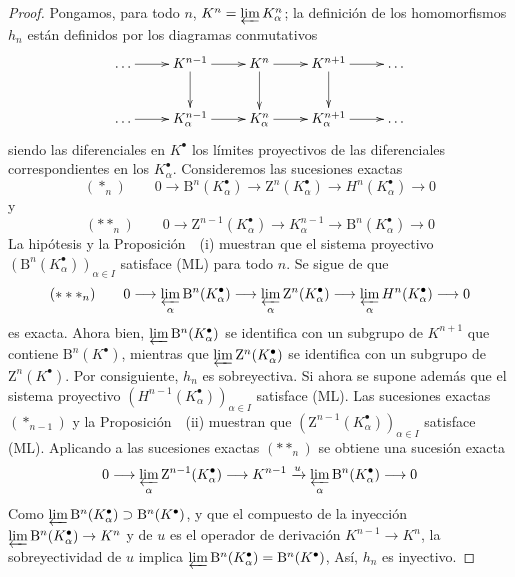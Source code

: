 \begin{proof}
Pongamos, para todo $n$, $K^n=\varprojlim K_\alpha^n$; la definición de los homomorfismos $h_n$ están definidos por los diagramas conmutativos
\[
\xymatrix{
\ldots\ar[r]&K^{n-1}\ar[r]\ar[d]&K^n\ar[r]\ar[d]
&K^{n+1}\ar[r]\ar[d]&\ldots\\
\ldots\ar[r]&K_\alpha^{n-1}\ar[r]&K_\alpha^n\ar[r]
&K_\alpha^{n+1}\ar[r]&\ldots
}
\]
siendo las diferenciales en $K^\bullet$ los límites proyectivos
de las diferenciales correspondientes en los
$K_\alpha^\bullet$.
Consideremos las sucesiones exactas
\[
(*_n)\qquad
0\longrightarrow \mathrm B^n(K_\alpha^\bullet)
\longrightarrow \mathrm Z^n(K_\alpha^\bullet)
\longrightarrow H^n(K_\alpha^\bullet)\longrightarrow0
\]
y
\[
(**_n)\qquad
0\longrightarrow \mathrm Z^{n-1}(K_\alpha^\bullet)
\longrightarrow K_\alpha^{n-1}
\longrightarrow \mathrm B^n(K_\alpha^\bullet)\longrightarrow0
\]
La hipótesis y la Proposición~~(i) muestran que el
sistema proyectivo
$(\mathrm B^n(K_\alpha^\bullet))_{\alpha\in I}$
satisface (ML) para todo $n$.
Se sigue de  que
\[
(***_n)\qquad
0\longrightarrow\varprojlim_\alpha\mathrm B^n(K_\alpha^\bullet)
\longrightarrow\varprojlim_\alpha\mathrm Z^n(K_\alpha^\bullet)
\longrightarrow\varprojlim_\alpha H^n(K_\alpha^\bullet)
\longrightarrow0
\]
es exacta.
Ahora bien,
$\varprojlim\mathrm B^n(K_\alpha^\bullet)$
se identifica con un subgrupo de $K^{n+1}$ que contiene
$\mathrm B^n(K^\bullet)$, mientras que
$\varprojlim\mathrm Z^n(K_\alpha^\bullet)$
se identifica con un subgrupo de $\mathrm Z^n(K^\bullet)$.
Por consiguiente, $h_n$ es sobreyectiva. Si ahora se supone además que el sistema proyectivo $(H^{n-1}(K_\alpha^\bullet))_{\alpha\in I}$
satisface (ML).
Las sucesiones exactas $(*_{n-1})$ y la
Proposición~~(ii) muestran que
$(\mathrm Z^{n-1}(K_\alpha^\bullet))_{\alpha\in I}$
satisface (ML).
Aplicando  a las sucesiones exactas $(**_n)$ se obtiene una
sucesión exacta
\[
0\longrightarrow
\varprojlim_\alpha\mathrm Z^{n-1}(K_\alpha^\bullet)
\longrightarrow K^{n-1}\xrightarrow{u}
\varprojlim_\alpha\mathrm B^n(K_\alpha^\bullet)
\longrightarrow0
\]
Como
$\varprojlim\mathrm B^n(K_\alpha^\bullet)
\supset\mathrm B^n(K^\bullet)$, y que el compuesto de la inyección $\varprojlim\mathrm B^n(K_\alpha^\bullet)\to K^n$ y de $u$ es el operador de derivación $K^{n-1}\to K^n$, la sobreyectividad de
$u$ implica
$\varprojlim\mathrm B^n(K_\alpha^\bullet)
=\mathrm B^n(K^\bullet)$,
Así, $h_n$ es inyectivo.
\end{proof}

